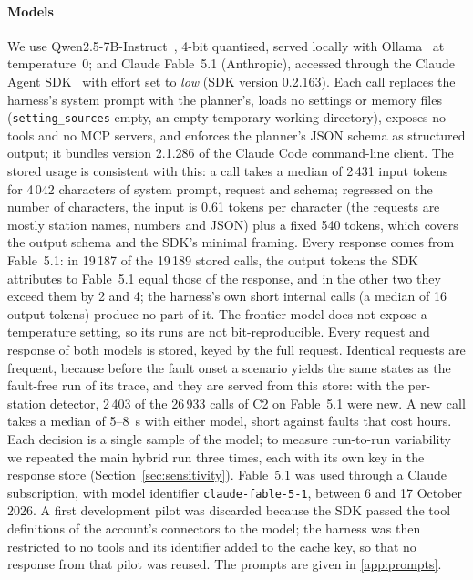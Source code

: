\documentclass[preprint,11pt]{elsarticle}
\begin{document}
\paragraph{Models}
We use Qwen2.5-7B-Instruct~\cite{qwen2024}, 4-bit quantised, served locally with Ollama~\cite{ollama} at temperature~0; and Claude Fable~5.1 (Anthropic), accessed through the Claude Agent SDK~\cite{anthropic2026agentsdk} with effort set to \emph{low} (SDK version 0.2.163). Each call replaces the harness's system prompt with the planner's, loads no settings or memory files (\texttt{setting\_sources} empty, an empty temporary working directory), exposes no tools and no MCP servers, and enforces the planner's JSON schema as structured output; it bundles version 2.1.286 of the Claude Code command-line client. The stored usage is consistent with this: a call takes a median of 2\,431 input tokens for 4\,042 characters of system prompt, request and schema; regressed on the number of characters, the input is 0.61 tokens per character (the requests are mostly station names, numbers and JSON) plus a fixed 540 tokens, which covers the output schema and the SDK's minimal framing. Every response comes from Fable~5.1: in 19\,187 of the 19\,189 stored calls, the output tokens the SDK attributes to Fable~5.1 equal those of the response, and in the other two they exceed them by 2 and 4; the harness's own short internal calls (a median of 16 output tokens) produce no part of it. The frontier model does not expose a temperature setting, so its runs are not bit-reproducible. Every request and response of both models is stored, keyed by the full request. Identical requests are frequent, because before the fault onset a scenario yields the same states as the fault-free run of its trace, and they are served from this store: with the per-station detector, 2\,403 of the 26\,933 calls of C2 on Fable~5.1 were new. A new call takes a median of 5--8~s with either model, short against faults that cost hours. Each decision is a single sample of the model; to measure run-to-run variability we repeated the main hybrid run three times, each with its own key in the response store (Section~\ref{sec:sensitivity}). Fable~5.1 was used through a Claude subscription, with model identifier \texttt{claude-fable-5-1}, between 6 and 17 October 2026. A first development pilot was discarded because the SDK passed the tool definitions of the account's connectors to the model; the harness was then restricted to no tools and its identifier added to the cache key, so that no response from that pilot was reused. The prompts are given in \ref{app:prompts}.
\end{document}
